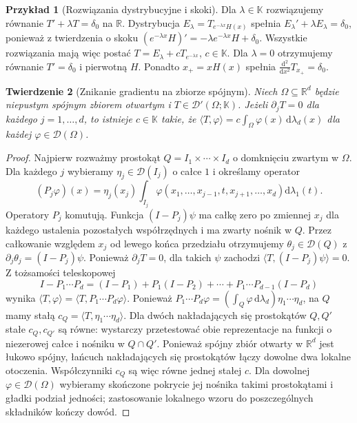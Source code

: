 \documentclass[11pt,a4paper]{article}
\numberwithin{equation}{section}
\theoremstyle{plain}
\newtheorem{twierdzenie}{Twierdzenie}[section]
\theoremstyle{definition}
\newtheorem{przyklad}[twierdzenie]{Przykład}
\theoremstyle{remark}
\newcommand{\R}{\mathbb R}
\newcommand{\K}{\mathbb K}
\begin{document}
\begin{przyklad}[Rozwiązania dystrybucyjne i skoki]
\label{ex:forced-ode20}
Dla $\lambda\in\K$ rozwiązujemy równanie
$T'+\lambda T=\delta_0$ na $\R$.
Dystrybucja $E_\lambda=T_{e^{-\lambda x}H(x)}$ spełnia
$E_\lambda'+\lambda E_\lambda=\delta_0$, ponieważ
z twierdzenia o skoku
$(e^{-\lambda x}H)'=-\lambda e^{-\lambda x}H+\delta_0$.
Wszystkie rozwiązania mają więc postać
$T=E_\lambda+cT_{e^{-\lambda x}}$, $c\in\K$.
Dla $\lambda=0$ otrzymujemy równanie $T'=\delta_0$
i pierwotną $H$. Ponadto $x_+=xH(x)$ spełnia
$\frac{\mathrm d^2}{\mathrm dx^2}T_{x_+}=\delta_0$.
\end{przyklad}

\begin{twierdzenie}[Znikanie gradientu na zbiorze spójnym]
\label{thm:zero-gradient20}
Niech $\Omega\subseteq\R^d$ będzie niepustym spójnym
zbiorem otwartym i $T\in\mathcal D'(\Omega;\K)$.
Jeżeli $\partial_jT=0$ dla każdego $j=1,\ldots,d$,
to istnieje $c\in\K$ takie, że
$\langle T,\varphi\rangle=c\int_\Omega\varphi(x)\,
\mathrm d\lambda_d(x)$ dla każdej $\varphi\in\mathcal D(\Omega)$.
\end{twierdzenie}
\begin{proof}
Najpierw rozważmy prostokąt $Q=I_1\times\cdots\times I_d$
o domknięciu zwartym w $\Omega$. Dla każdego $j$ wybieramy
$\eta_j\in\mathcal D(I_j)$ o całce $1$ i określamy operator
\[
 (P_j\varphi)(x)=\eta_j(x_j)
 \int_{I_j}\varphi(x_1,\ldots,x_{j-1},t,x_{j+1},\ldots,x_d)
 \mathrm d\lambda_1(t).
\]
Operatory $P_j$ komutują. Funkcja $(I-P_j)\psi$ ma całkę
zero po zmiennej $x_j$ dla każdego ustalenia pozostałych
współrzędnych i ma zwarty nośnik w $Q$.
Przez całkowanie względem $x_j$ od lewego końca przedziału
otrzymujemy $\theta_j\in\mathcal D(Q)$ z
$\partial_j\theta_j=(I-P_j)\psi$. Ponieważ
$\partial_jT=0$, dla takich $\psi$ zachodzi
$\langle T,(I-P_j)\psi\rangle=0$.
Z tożsamości teleskopowej
\[
 I-P_1\cdots P_d
 =(I-P_1)+P_1(I-P_2)+\cdots+P_1\cdots P_{d-1}(I-P_d)
\]
wynika
$\langle T,\varphi\rangle=\langle T,P_1\cdots P_d\varphi\rangle$.
Ponieważ
$P_1\cdots P_d\varphi=(\int_Q\varphi\,\mathrm d\lambda_d)
\eta_1\cdots\eta_d$,
na $Q$ mamy stałą $c_Q=\langle T,\eta_1\cdots\eta_d\rangle$.
Dla dwóch nakładających się prostokątów $Q,Q'$ stałe
$c_Q,c_{Q'}$ są równe: wystarczy przetestować obie
reprezentacje na funkcji o niezerowej całce i nośniku
w $Q\cap Q'$. Ponieważ spójny zbiór otwarty w $\R^d$
jest łukowo spójny, łańcuch nakładających się prostokątów
łączy dowolne dwa lokalne otoczenia. Współczynniki
$c_Q$ są więc równe jednej stałej $c$.
Dla dowolnej $\varphi\in\mathcal D(\Omega)$ wybieramy
skończone pokrycie jej nośnika takimi prostokątami
i gładki podział jedności; zastosowanie lokalnego wzoru
do poszczególnych składników kończy dowód.
\end{proof}
\end{document}
